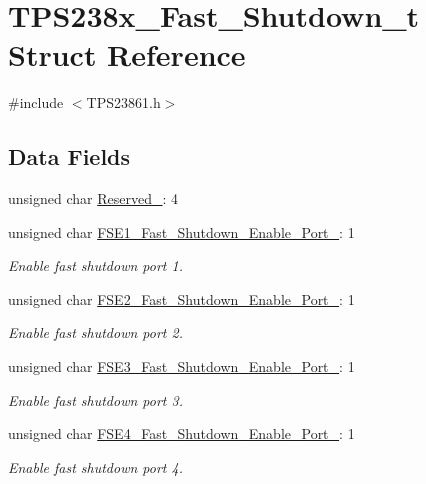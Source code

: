 \hypertarget{struct_t_p_s238x___fast___shutdown__t}{\section{T\-P\-S238x\-\_\-\-Fast\-\_\-\-Shutdown\-\_\-t Struct Reference}
\label{struct_t_p_s238x___fast___shutdown__t}
}


{\ttfamily \#include $<$T\-P\-S23861.\-h$>$}

\subsection*{Data Fields}
\begin{DoxyCompactItemize}
\item 
unsigned char \hyperlink{struct_t_p_s238x___fast___shutdown__t_a7afb7052704127db4a805138745e1d34}{Reserved\-\_}\-: 4
\item 
unsigned char \hyperlink{struct_t_p_s238x___fast___shutdown__t_a47baaf5cf4b8f221b848c85209f8aa61}{F\-S\-E1\-\_\-\-Fast\-\_\-\-Shutdown\-\_\-\-Enable\-\_\-\-Port\-\_}\-: 1
\begin{DoxyCompactList}\small\item\em Enable fast shutdown port 1. \end{DoxyCompactList}\item 
unsigned char \hyperlink{struct_t_p_s238x___fast___shutdown__t_a9c9be78fe36df0acd8ac8dc612f1c492}{F\-S\-E2\-\_\-\-Fast\-\_\-\-Shutdown\-\_\-\-Enable\-\_\-\-Port\-\_}\-: 1
\begin{DoxyCompactList}\small\item\em Enable fast shutdown port 2. \end{DoxyCompactList}\item 
unsigned char \hyperlink{struct_t_p_s238x___fast___shutdown__t_abeaad9c31580ae51686bb095700fdb25}{F\-S\-E3\-\_\-\-Fast\-\_\-\-Shutdown\-\_\-\-Enable\-\_\-\-Port\-\_}\-: 1
\begin{DoxyCompactList}\small\item\em Enable fast shutdown port 3. \end{DoxyCompactList}\item 
unsigned char \hyperlink{struct_t_p_s238x___fast___shutdown__t_ae226b67ecda7b0c8a433816d97e99cf8}{F\-S\-E4\-\_\-\-Fast\-\_\-\-Shutdown\-\_\-\-Enable\-\_\-\-Port\-\_}\-: 1
\begin{DoxyCompactList}\small\item\em Enable fast shutdown port 4. \end{DoxyCompactList}\end{DoxyCompactItemize}


